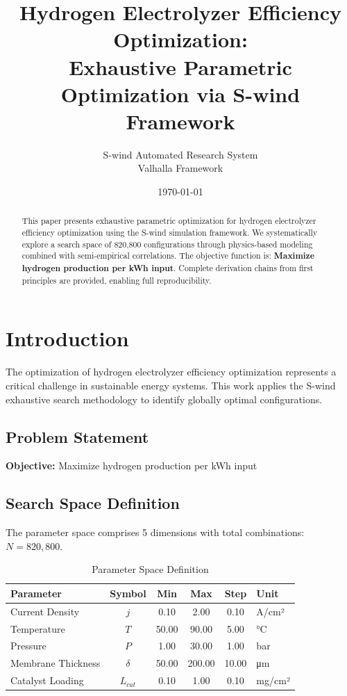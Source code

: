 \documentclass[11pt,twocolumn]{article}
\title{Hydrogen Electrolyzer Efficiency Optimization: \\Exhaustive Parametric Optimization via S-wind Framework}
\author{S-wind Automated Research System\\Valhalla Framework}
\date{\today}
\begin{document}
\maketitle

\begin{abstract}
This paper presents exhaustive parametric optimization for hydrogen electrolyzer efficiency optimization using the S-wind simulation framework.
We systematically explore a search space of 820,800 configurations through physics-based modeling
combined with semi-empirical correlations. The objective function is: \textbf{Maximize hydrogen production per kWh input}.
Complete derivation chains from first principles are provided, enabling full reproducibility.
\end{abstract}

\section{Introduction}
The optimization of hydrogen electrolyzer efficiency optimization represents a critical challenge in sustainable energy systems.
This work applies the S-wind exhaustive search methodology to identify globally optimal configurations.

\subsection{Problem Statement}
\textbf{Objective:} Maximize hydrogen production per kWh input

\subsection{Search Space Definition}
The parameter space comprises 5 dimensions with total combinations: $N = 820,800$.

\begin{table}[h]
\centering
\caption{Parameter Space Definition}
\begin{tabular}{@{}lccccl@{}}
\toprule
Parameter & Symbol & Min & Max & Step & Unit \\
\midrule
Current Density & $j$ & 0.10 & 2.00 & 0.10 & A/cm² \\
Temperature & $T$ & 50.00 & 90.00 & 5.00 & °C \\
Pressure & $P$ & 1.00 & 30.00 & 1.00 & bar \\
Membrane Thickness & $\delta$ & 50.00 & 200.00 & 10.00 & μm \\
Catalyst Loading & $L_{cat}$ & 0.10 & 1.00 & 0.10 & mg/cm² \\
\bottomrule
\end{tabular}
\end{table}
\end{document}
